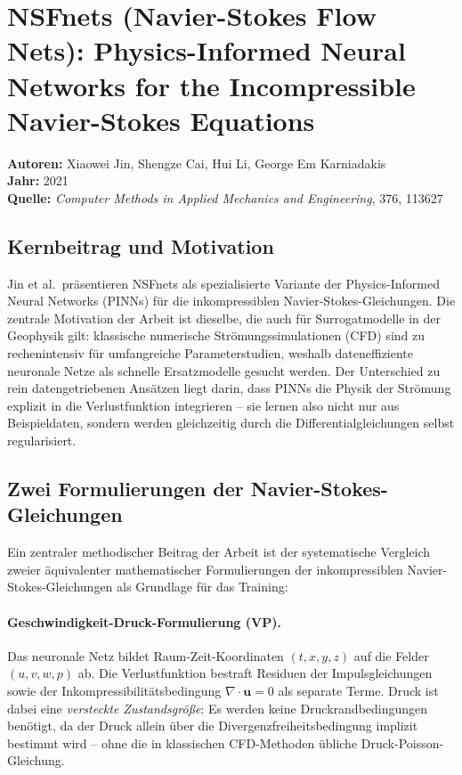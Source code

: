 \documentclass[a4paper,12pt]{article}
\begin{document}
\section*{NSFnets (Navier-Stokes Flow Nets): Physics-Informed Neural Networks
for the Incompressible Navier-Stokes Equations}

\textbf{Autoren:} Xiaowei Jin, Shengze Cai, Hui Li, George Em Karniadakis \\
\textbf{Jahr:} 2021 \\
\textbf{Quelle:} \textit{Computer Methods in Applied Mechanics and Engineering}, 376, 113627

\subsection*{Kernbeitrag und Motivation}

Jin et al.\ präsentieren NSFnets als spezialisierte Variante der
Physics-Informed Neural Networks (PINNs) für die inkompressiblen
Navier-Stokes-Gleichungen. Die zentrale Motivation der Arbeit ist dieselbe,
die auch für Surrogatmodelle in der Geophysik gilt: klassische numerische
Strömungssimulationen (CFD) sind zu rechenintensiv für umfangreiche
Parameterstudien, weshalb dateneffiziente neuronale Netze als schnelle
Ersatzmodelle gesucht werden. Der Unterschied zu rein datengetriebenen
Ansätzen liegt darin, dass PINNs die Physik der Strömung explizit in die
Verlustfunktion integrieren -- sie lernen also nicht nur aus Beispieldaten,
sondern werden gleichzeitig durch die Differentialgleichungen selbst
regularisiert.

\subsection*{Zwei Formulierungen der Navier-Stokes-Gleichungen}

Ein zentraler methodischer Beitrag der Arbeit ist der systematische Vergleich
zweier äquivalenter mathematischer Formulierungen der inkompressiblen
Navier-Stokes-Gleichungen als Grundlage für das Training:

\paragraph{Geschwindigkeit-Druck-Formulierung (VP).}
Das neuronale Netz bildet Raum-Zeit-Koordinaten $(t, x, y, z)$ auf die
Felder $(u, v, w, p)$ ab. Die Verlustfunktion bestraft Residuen der
Impulsgleichungen sowie der Inkompressibilitätsbedingung
$\nabla \cdot \mathbf{u} = 0$ als separate Terme. Druck ist dabei eine
\emph{versteckte Zustandsgröße}: Es werden keine Druckrandbedingungen
benötigt, da der Druck allein über die Divergenzfreiheitsbedingung implizit
bestimmt wird -- ohne die in klassischen CFD-Methoden übliche
Druck-Poisson-Gleichung.
\end{document}
